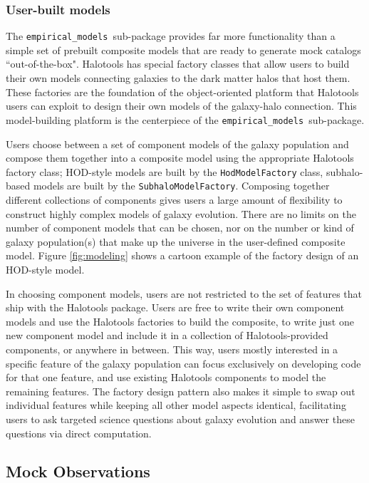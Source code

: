 \documentclass[twocolumn, tighten]{aastex6}
\newcommand{\emodels}{{\tt empirical\_models }}
\begin{document}
\subsubsection{User-built models}
\label{subsubsection:userbuiltmodels}

The \emodels sub-package provides far more functionality than a simple set of prebuilt composite models that are ready to generate mock catalogs ``out-of-the-box". Halotools has special factory classes that allow users to build their own models connecting galaxies to the dark matter halos that host them. These factories are the foundation of the object-oriented platform that Halotools users can exploit to design their own models of the galaxy-halo connection. This model-building platform is the centerpiece of the \emodels sub-package.

Users choose between a set of component models of the galaxy population and compose them together into a composite model using the appropriate Halotools factory class; HOD-style models are built by the {\tt HodModelFactory} class, subhalo-based models are built by the {\tt SubhaloModelFactory}. Composing together different collections of components gives users a large amount of flexibility to construct highly complex models of galaxy evolution. There are no limits on the number of component models that can be chosen, nor on the number or kind of galaxy population(s) that make up the universe in the user-defined composite model. Figure \ref{fig:modeling} shows a cartoon example of the factory design of an HOD-style model. 

In choosing component models, users are not restricted to the set of features that ship with the Halotools package. Users are free to write their own component models and use the Halotools factories to build the composite, to write just one new component model and include it in a collection of Halotools-provided components, or anywhere in between. This way, users mostly interested in a specific feature of the galaxy population can focus exclusively on developing code for that one feature, and use existing Halotools components to model the remaining features. The factory design pattern also makes it simple to swap out individual features while keeping all other model aspects identical, facilitating users to ask targeted science questions about galaxy evolution and answer these questions via direct computation. 

\subsection{Mock Observations}
\label{subsection:mock_observables}
\end{document}
